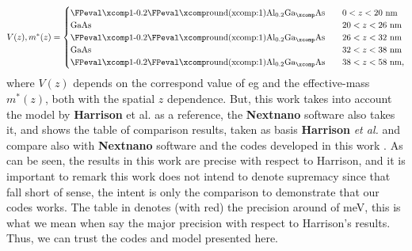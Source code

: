\begin{equation}\label{eqn:chapter-2-sec-numerical-calculations-harrison-potential-profile}
	V(z),m^{*}(z)=\begin{cases}
		\text{\algaasx{0.2}}\quad &0<z<20\text{ nm}\\
		\text{GaAs}\quad    &20<z<26\text{ nm}\\
		\text{\algaasx{0.2}}\quad &26<z<32\text{ nm}\\
		\text{GaAs}\quad    &32<z<38\text{ nm}\\
		\text{\algaasx{0.2}}\quad &38<z<58\text{ nm},
	\end{cases}
\end{equation}
where  $V(z)$ depends on  the correspond value of \gls{eg} and the effective-mass $m^{*}(z)$, both with the spatial $z$ dependence. But, this work takes into account the model by \textbf{Harrison} et al.\cite{harrison2016quantum} as a reference, the \textbf{Nextnano} software\cite{birner2007Nextnano,Nextnanoharrison} also takes it,  and  shows the table of comparison results, taken as basis \textbf{Harrison} \textit{et al.} and compare also with  \textbf{Nextnano} software and the codes developed in this work \cite{cqws-codes}. As can be seen, the results in this work are precise with respect to Harrison, and it is important to remark this work does not intend to denote supremacy since that fall short of sense, the intent is only the comparison to demonstrate that our codes works. The table in  denotes (with red) the precision around of meV, this is what we mean when say the major precision with respect to Harrison's results. Thus, we can trust the codes and model presented here. 
